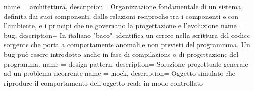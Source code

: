  {
  name = architettura,
  description={
		Organizzazione fondamentale di un sistema, definita dai suoi componenti, dalle relazioni reciproche tra i componenti e con l'ambiente, e i principi che ne governano la progettazione e l'evoluzione}
}
 {
  name = bug,
  description={
		In italiano "baco", identifica un errore nella scrittura del codice sorgente che porta a comportamente anomali e non previsti del programmma. Un bug può essere introdotto anche in fase di compilazione o di progettazione del programma.}
}
 {
  name = design pattern,
  description={
		Soluzione progettuale generale ad un problema ricorrente}
}
 {
  name = mock,
  description={
		Oggetto simulato che riproduce il comportamento dell'oggetto reale in modo controllato}
}





